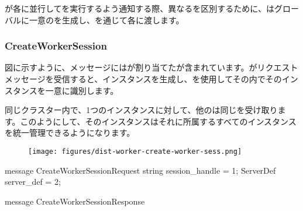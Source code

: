 \begin{content}
が各に並行してを実行するよう通知する際、異なるを区別するために、はグローバルに一意のを生成し、を通じて各に渡します。

\begin{enum}
\end{enum}

\subsubsection{CreateWorkerSession}

図に示すように、メッセージにはが割り当てたが含まれています。がリクエストメッセージを受信すると、インスタンスを生成し、を使用してその内でそのインスタンスを一意に識別します。

同じクラスター内で、1つのインスタンスに対して、他のは同じを受け取ります。このようにして、そのインスタンスはそれに所属するすべてのインスタンスを統一管理できるようになります。

\begin{figure}[H]
\centering
\texttt{[image: figures/dist-worker-create-worker-sess.png]}
\caption{}
 \label{fig:dist-worker-create-worker-sess}
\end{figure}

\begin{leftbar}
\begin{c++}
message CreateWorkerSessionRequest {
  string session_handle = 1;
  ServerDef server_def = 2;
}

message CreateWorkerSessionResponse {
}
\end{c++}
\end{leftbar}


\end{content}
